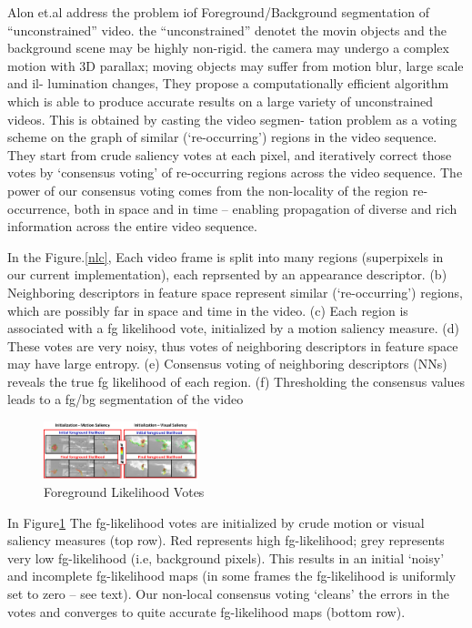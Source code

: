 Alon et.al \cite{Faktor2014Video} address the problem iof Foreground/Background segmentation of “unconstrained”
video. the ``unconstrained'' denotet the movin objects and the background scene may be highly non-rigid.  
the camera may undergo a complex motion with 3D parallax; moving objects may suffer from motion blur, large scale and il-
lumination changes,
They propose a computationally efficient algorithm which is able to produce accurate results
on a large variety of unconstrained videos. This is obtained by casting the video segmen-
tation problem as a voting scheme on the graph of similar (‘re-occurring’) regions in the
video sequence. They start from crude saliency votes at each pixel, and iteratively correct
those votes by ‘consensus voting’ of re-occurring regions across the video sequence. The
power of our consensus voting comes from the non-locality of the region re-occurrence,
both in space and in time – enabling propagation of diverse and rich information across
the entire video sequence.


In the Figure.\ref{nlc}, Each video frame is split into many regions (superpixels in
our current implementation), each reprsented by an appearance descriptor. (b) Neighboring descriptors
in feature space represent similar (‘re-occurring’) regions, which are possibly far in space and time
in the video. (c) Each region is associated with a fg likelihood vote, initialized by a motion saliency
measure. (d) These votes are very noisy, thus votes of neighboring descriptors in feature space may
have large entropy. (e) Consensus voting of neighboring descriptors (NNs) reveals the true fg likelihood
of each region. (f) Thresholding the consensus values leads to a fg/bg segmentation of the video

\begin{figure}[ht]
    \centering
    \includegraphics[width=0.40\textwidth]{figure/NLC_voting.png}
    \caption{Foreground Likelihood Votes}
    \label{voting}
\end{figure}

In Figure\ref{voting} The fg-likelihood votes are initialized by crude motion
or visual saliency measures (top row). Red represents high fg-likelihood; grey represents very low
fg-likelihood (i.e, background pixels). This results in an initial ‘noisy’ and incomplete fg-likelihood
maps (in some frames the fg-likelihood is uniformly set to zero – see text). Our non-local consensus
voting ‘cleans’ the errors in the votes and converges to quite accurate fg-likelihood maps (bottom row).


